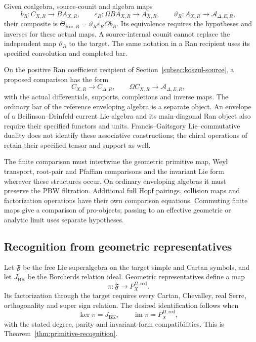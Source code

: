 Given coalgebra, source-counit and algebra maps
\[
 b_R:C_{X,R}\longrightarrow BA_{X,R},\qquad
 \varepsilon_R:\Omega BA_{X,R}\longrightarrow A_{X,R},\qquad
 \vartheta_R:A_{X,R}\longrightarrow\mathcal A_{\Delta,E,R},
\]
their composite is
\(\Theta_{\mathrm{Kos},R}=\vartheta_R\varepsilon_R\Omega b_R\).
Its equivalence requires the hypotheses and inverses for these
actual maps. A source-internal counit cannot replace the independent
map \(\vartheta_R\) to the target. The same notation in a Ran
recipient uses its specified convolution and completed bar.

On the positive Ran coefficient recipient of
Section~\ref{subsec:koszul-source}, a proposed comparison has the
form
\[
 C_{X,R}\longrightarrow C_{\Delta,R},\qquad
 \Omega C_{X,R}\longrightarrow\mathcal A_{\Delta,E,R},
\]
with the actual differentials, supports, completions and inverse
maps. The ordinary bar of the reference enveloping algebra is a
separate object. An envelope of a Beilinson--Drinfeld current Lie
algebra and its main-diagonal Ran object also require their specified
functors and units. Francis--Gaitsgory Lie--commutative duality
\cite{FrancisGaitsgoryCKD} does not identify these associative
constructions; the chiral operations of \cite{BD} retain their
specified tensor and support as well.

The finite comparison must intertwine the geometric primitive map,
Weyl transport, root-pair and Pfaffian comparisons and the invariant
Lie form wherever these structures occur. On ordinary enveloping
algebras it must preserve the PBW filtration. Additional full Hopf
pairings, collision maps and factorization operations have their own
comparison equations. Commuting finite maps give a comparison of
pro-objects; passing to an effective geometric or analytic limit
uses separate hypotheses.

\subsection{Recognition from geometric representatives}
\label{app:build-recognition}

Let \(\mathfrak F\) be the free Lie superalgebra on the target
simple and Cartan symbols, and let \(J_{\mathrm{BK}}\) be the
Borcherds relation ideal. Geometric representatives define a map
\[
 \pi:\mathfrak F\longrightarrow P_X^{\Pi,\mathrm{red}}.
\]
Its factorization through the target requires every Cartan,
Chevalley, real Serre, orthogonality and super sign relation.
The desired identification follows when
\[
 \ker\pi=J_{\mathrm{BK}},\qquad
 \operatorname{im}\pi=P_X^{\Pi,\mathrm{red}},
\]
with the stated degree, parity and invariant-form compatibilities.
This is Theorem~\ref{thm:primitive-recognition}.


